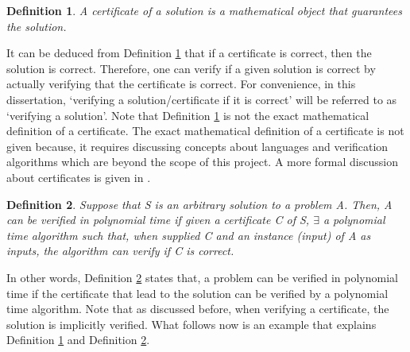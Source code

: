\documentclass[12pt]{article}
\newtheorem{definition}{Definition}[subsection]
\numberwithin{equation}{subsection}
\numberwithin{table}{subsection}
\numberwithin{algorithm}{subsection}
\numberwithin{figure}{subsection}
\begin{document}
\begin{definition}
\label{certificate}
A certificate of a solution is a mathematical object that guarantees the solution.
\end{definition}
It can be deduced from Definition \ref{certificate} that if a certificate is correct, then the solution is correct. Therefore, one can verify if a given solution is correct by actually verifying that the certificate is correct. For convenience, in this dissertation, `verifying a solution/certificate if it is correct' will be referred to as `verifying a solution'. Note that Definition \ref{certificate} is not the exact mathematical definition of a certificate. The exact mathematical definition of a certificate is not given because, it requires discussing concepts about languages and verification algorithms which are beyond the scope of this project. A more formal discussion about certificates is given in \cite{cormen_leiserson_rivest_stein}.
\begin{definition}
\label{polynomial_time_verification}
Suppose that S is an arbitrary solution to a problem A. Then, A can be verified in polynomial time if given a certificate C of S, $\exists$ a polynomial time algorithm such that, when supplied C and an instance (input) of A as inputs, the algorithm can verify if C is correct. {}
\end{definition}
In other words, Definition \ref{polynomial_time_verification} states that, a problem can be verified in polynomial time if the certificate that lead to the solution can be verified by a polynomial time algorithm. Note that as discussed before, when verifying a certificate, the solution is implicitly verified. What follows now is an example that explains Definition \ref{certificate} and Definition \ref{polynomial_time_verification}.
\end{document}
